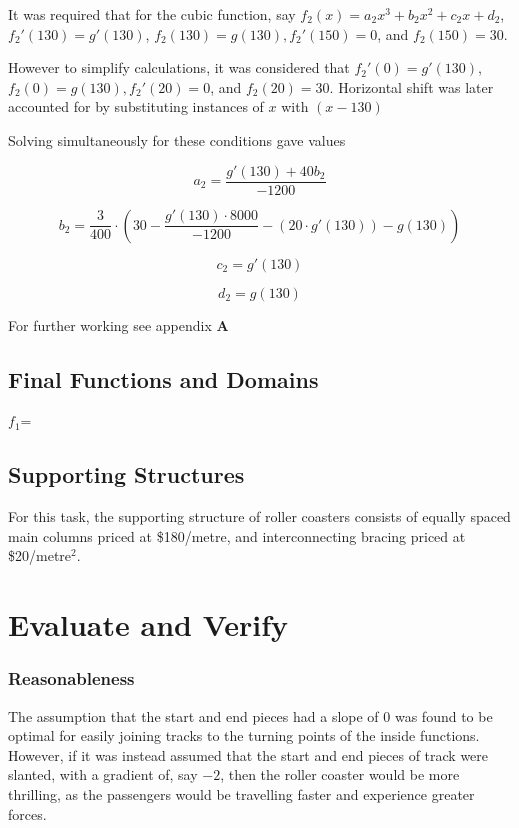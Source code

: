 \documentclass[11pt, letterpaper]{article}
\begin{document}
It was required that for the cubic function, say $f_2(x)=a_2x^3+b_2x^2+c_2x+d_2$, $f_2'(130)=g'(130)$, $f_2(130)=g(130), f_2'(150)=0$, and $f_2(150)=30$. 
	
However to simplify calculations, it was considered that $f_2'(0)=g'(130)$, $f_2(0)=g(130), f_2'(20)=0$, and $f_2(20)=30$. Horizontal shift was later accounted for by substituting instances of $x$ with $(x-130)$
	

Solving simultaneously for these conditions gave values 
	
	$$a_{2}=\frac{g'\left(130\right)+40b_{2}}{-1200}$$
	
	$$b_{2}=\frac{3}{400}\cdot\left(30-\frac{g'\left(130\right)\cdot8000}{-1200}-\left(20\cdot g'\left(130\right)\right)-g\left(130\right)\right)$$
	
	$$c_{2}=g'\left(130\right)$$
	
	$$d_{2}=g\left(130\right)$$

For further working see appendix $\mathbf{A}$
	


\subsection{Final Functions and Domains}

$f_1$=


\subsection{Supporting Structures}
For this task, the supporting structure of roller coasters consists of equally spaced main columns priced at \$180/metre, and interconnecting bracing priced at \$20/metre$^2$.


\section{Evaluate and Verify}
\subsubsection{Reasonableness}



The assumption that the start and end pieces had a slope of 0 was found to be optimal for easily joining tracks to the  turning points of the inside functions. However, if it was instead assumed that the start and end pieces of track were slanted, with a gradient of, say $-2$, then the roller coaster would be more thrilling, as the passengers would be travelling faster and experience greater forces.
\end{document}
